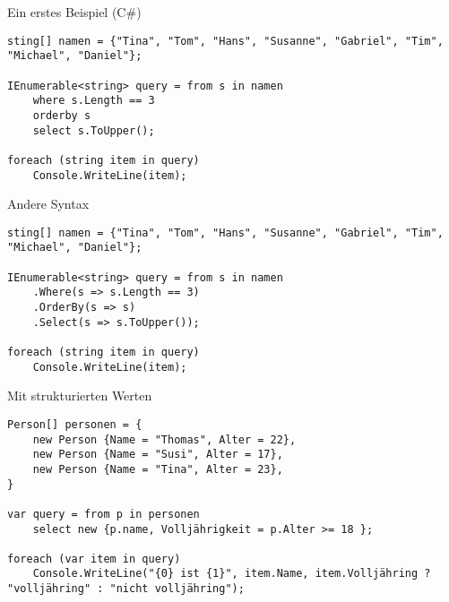 \begin{frame}[fragile]{Ein erstes Beispiel (C\#)}
\begin{lstlisting}[style=sharpc]
sting[] namen = {"Tina", "Tom", "Hans", "Susanne", "Gabriel", "Tim", "Michael", "Daniel"};

IEnumerable<string> query = from s in namen
	where s.Length == 3
	orderby s
	select s.ToUpper();

foreach (string item in query)
	Console.WriteLine(item);
\end{lstlisting}
\end{frame}

\begin{frame}[fragile]{Andere Syntax}
\begin{lstlisting}[style=sharpc]
sting[] namen = {"Tina", "Tom", "Hans", "Susanne", "Gabriel", "Tim", "Michael", "Daniel"};

IEnumerable<string> query = from s in namen
	.Where(s => s.Length == 3)
	.OrderBy(s => s)
	.Select(s => s.ToUpper());

foreach (string item in query)
	Console.WriteLine(item);
\end{lstlisting}
\end{frame}


\begin{frame}[fragile]{Mit strukturierten Werten}
\begin{lstlisting}[style=sharpc]
Person[] personen = {
	new Person {Name = "Thomas", Alter = 22},
	new Person {Name = "Susi", Alter = 17},
	new Person {Name = "Tina", Alter = 23},
}

var query = from p in personen
	select new {p.name, Volljährigkeit = p.Alter >= 18 };

foreach (var item in query)
	Console.WriteLine("{0} ist {1}", item.Name, item.Volljähring ? "volljähring" : "nicht volljähring");
\end{lstlisting}
\end{frame}

